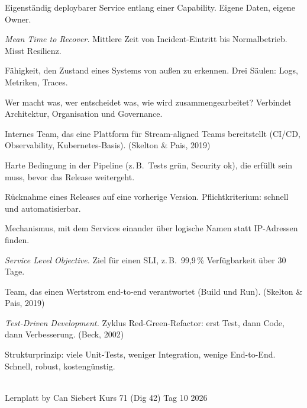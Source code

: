 \documentclass[11pt,a4paper,oneside]{article}
\newcommand{\quelle}[1]{{\footnotesize\color{lpGray}(#1)}}
\begin{document}
\begin{description}[style=nextline,leftmargin=0pt,labelindent=0pt,itemsep=4pt]
  \item[Microservice] Eigenständig deploybarer Service entlang einer Capability. Eigene Daten, eigene Owner.
  \item[MTTR] \emph{Mean Time to Recover.} Mittlere Zeit von Incident-Eintritt bis Normalbetrieb. Misst Resilienz.
  \item[Observability] Fähigkeit, den Zustand eines Systems von außen zu erkennen. Drei Säulen: Logs, Metriken, Traces.
  \item[Operating Model] Wer macht was, wer entscheidet was, wie wird zusammengearbeitet? Verbindet Architektur, Organisation und Governance.
  \item[Plattformteam] Internes Team, das eine Plattform für Stream-aligned Teams bereitstellt (CI/CD, Observability, Kubernetes-Basis). \quelle{Skelton \& Pais, 2019}
  \item[Quality Gate] Harte Bedingung in der Pipeline (z.\,B.\ Tests grün, Security ok), die erfüllt sein muss, bevor das Release weitergeht.
  \item[Rollback] Rücknahme eines Releases auf eine vorherige Version. Pflichtkriterium: schnell und automatisierbar.
  \item[Service Discovery] Mechanismus, mit dem Services einander über logische Namen statt IP-Adressen finden.
  \item[SLO] \emph{Service Level Objective.} Ziel für einen SLI, z.\,B.\ 99,9\,\% Verfügbarkeit über 30 Tage.
  \item[Stream-aligned Team] Team, das einen Wertstrom end-to-end verantwortet (Build und Run). \quelle{Skelton \& Pais, 2019}
  \item[TDD] \emph{Test-Driven Development.} Zyklus Red-Green-Refactor: erst Test, dann Code, dann Verbesserung. \quelle{Beck, 2002}
  \item[Testpyramide] Strukturprinzip: viele Unit-Tests, weniger Integration, wenige End-to-End. Schnell, robust, kostengünstig.
\end{description}

\vspace{1cm}
\noindent{\color{lpAccent}\rule{\linewidth}{0.6pt}}\\[4pt]
{\footnotesize\sffamily\color{lpGray}Lernplatt \textperiodcentered{} by Can Siebert \textperiodcentered{} Kurs 71 (Dig 42) \textperiodcentered{} Tag 10 \textperiodcentered{} \textcopyright{} 2026}
\end{document}
